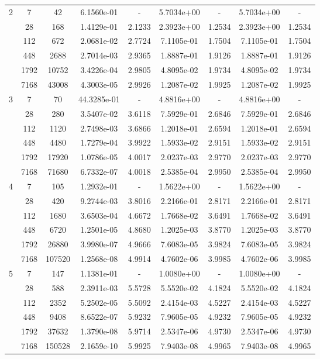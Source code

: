 \begin{longtable}{| c | c c | c c | c c | c c |}
	\hline

	2	& 7 & 42 & 6.1560e-01 & - & 5.7034e+00 & - & 5.7034e+00 & - \\
		& 28 & 168 & 1.4129e-01 & 2.1233 & 2.3923e+00 & 1.2534 & 2.3923e+00 & 1.2534 \\
		& 112 & 672 & 2.0681e-02 & 2.7724 & 7.1105e-01 & 1.7504 & 7.1105e-01 & 1.7504 \\
		& 448 & 2688 & 2.7014e-03 & 2.9365 & 1.8887e-01 & 1.9126 & 1.8887e-01 & 1.9126 \\
		& 1792 & 10752 & 3.4226e-04 & 2.9805 & 4.8095e-02 & 1.9734 & 4.8095e-02 & 1.9734 \\
		& 7168 & 43008 & 4.3003e-05 & 2.9926 & 1.2087e-02 & 1.9925 & 1.2087e-02 & 1.9925 \\

	\hline

	3	& 7 & 70 & 44.3285e-01 & - & 4.8816e+00 & - & 4.8816e+00 & - \\
		& 28 & 280 & 3.5407e-02 & 3.6118 & 7.5929e-01 & 2.6846 & 7.5929e-01 & 2.6846 \\
		& 112 & 1120 & 2.7498e-03 & 3.6866 & 1.2018e-01 & 2.6594 & 1.2018e-01 & 2.6594 \\
		& 448 & 4480 & 1.7279e-04 & 3.9922 & 1.5933e-02 & 2.9151 & 1.5933e-02 & 2.9151 \\
		& 1792 & 17920 & 1.0786e-05 & 4.0017 & 2.0237e-03 & 2.9770 & 2.0237e-03 & 2.9770 \\
		& 7168 & 71680 & 6.7332e-07 & 4.0018 & 2.5385e-04 & 2.9950 & 2.5385e-04 & 2.9950 \\

	\hline

	4	& 7 & 105 & 1.2932e-01 & - & 1.5622e+00 & - & 1.5622e+00 & - \\
		& 28 & 420 & 9.2744e-03 & 3.8016 & 2.2166e-01 & 2.8171 & 2.2166e-01 & 2.8171 \\
		& 112 & 1680 & 3.6503e-04 & 4.6672 & 1.7668e-02 & 3.6491 & 1.7668e-02 & 3.6491 \\
		& 448 & 6720 & 1.2501e-05 & 4.8680 & 1.2025e-03 & 3.8770 & 1.2025e-03 & 3.8770 \\
		& 1792 & 26880 & 3.9980e-07 & 4.9666 & 7.6083e-05 & 3.9824 & 7.6083e-05 & 3.9824 \\
		& 7168 & 107520 & 1.2568e-08 & 4.9914 & 4.7602e-06 & 3.9985 & 4.7602e-06 & 3.9985 \\

	\hline

	5	& 7 & 147 & 1.1381e-01 & - & 1.0080e+00 & - & 1.0080e+00 & - \\
		& 28 & 588 & 2.3911e-03 & 5.5728 & 5.5520e-02 & 4.1824 & 5.5520e-02 & 4.1824 \\
		& 112 & 2352 & 5.2502e-05 & 5.5092 & 2.4154e-03 & 4.5227 & 2.4154e-03 & 4.5227 \\
		& 448 & 9408 & 8.6522e-07 & 5.9232 & 7.9605e-05 & 4.9232 & 7.9605e-05 & 4.9232 \\
		& 1792 & 37632 & 1.3790e-08 & 5.9714 & 2.5347e-06 & 4.9730 & 2.5347e-06 & 4.9730 \\
		& 7168 & 150528 & 2.1659e-10 & 5.9925 & 7.9403e-08 & 4.9965 & 7.9403e-08 & 4.9965 \\
	

\end{longtable}
